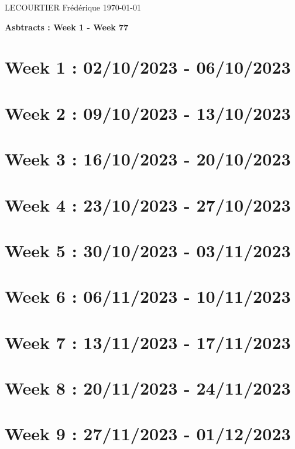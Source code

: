 \documentclass[french]{article}
\begin{document}
	LECOURTIER Frédérique \hfill \today
	\begin{center}
		\Large\textbf{{Asbtracts : Week 1 - Week 77}}
	\end{center}

	\section{Week 1 : 02/10/2023 - 06/10/2023}
	

	\section{Week 2 : 09/10/2023 - 13/10/2023}
	

	\section{Week 3 : 16/10/2023 - 20/10/2023}
	

	\section{Week 4 : 23/10/2023 - 27/10/2023}
	

	\section{Week 5 : 30/10/2023 - 03/11/2023}
	

	\section{Week 6 : 06/11/2023 - 10/11/2023}
	

	\section{Week 7 : 13/11/2023 - 17/11/2023}
	

	\section{Week 8 : 20/11/2023 - 24/11/2023}
	

	\section{Week 9 : 27/11/2023 - 01/12/2023}
	
\end{document}
